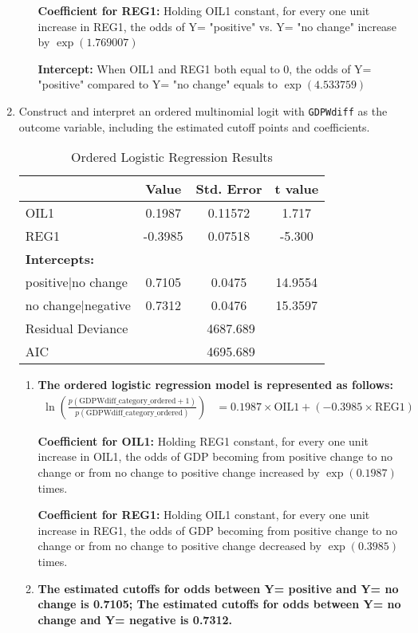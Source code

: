 \documentclass[12pt,letterpaper]{article}
\begin{document}
\begin{enumerate}
\begin{enumerate}
		\textbf{Coefficient for REG1:}
		Holding OIL1 constant, for every one unit increase in REG1, the odds of Y= "positive" vs. Y= "no change" increase by $\exp(1.769007)$
		
		\textbf{Intercept:}
		When OIL1 and REG1 both equal to 0, the odds of Y= "positive" compared to Y= "no change" equals to $\exp(4.533759)$
	\end{enumerate}
	\vspace{3 cm}
	\item Construct and interpret an ordered multinomial logit with \texttt{GDPWdiff} as the outcome variable, including the estimated cutoff points and coefficients.
	 
	\begin{table}[htbp]
		\centering
		\caption{Ordered Logistic Regression Results}
		\begin{tabular}{lccc}
			\toprule
			& \textbf{Value} & \textbf{Std. Error} & \textbf{t value} \\
			\midrule
			OIL1  & 0.1987 & 0.11572 & 1.717 \\
			REG1  & -0.3985 & 0.07518 & -5.300 \\
			\midrule
			\multicolumn{4}{l}{\textbf{Intercepts:}} \\
			\midrule
			positive|no change  & 0.7105 & 0.0475 & 14.9554 \\
			no change|negative  & 0.7312 & 0.0476 & 15.3597 \\
			\midrule
			Residual Deviance & \multicolumn{3}{c}{4687.689} \\
			AIC   & \multicolumn{3}{c}{4695.689} \\
			\bottomrule
		\end{tabular}
		\label{tab:ordered_logistic_results}
	\end{table}
	\vspace{2cm}
	\begin{enumerate}
		\item \textbf{The ordered logistic regression model is represented as follows:}
		\begin{align*}
			\ln\left(\frac{p(\text{GDPWdiff\_category\_ordered}+1)}{p(\text{GDPWdiff\_category\_ordered})}\right) &= 0.1987 \times \text{OIL1} + (-0.3985 \times \text{REG1})
		\end{align*}
		
		\textbf{Coefficient for OIL1:}
		Holding REG1 constant, for every one unit increase in OIL1, the odds of GDP becoming from positive change to no change or from no change to positive change increased by $\exp(0.1987)$ times.
		
		\textbf{Coefficient for REG1:}
		Holding OIL1 constant, for every one unit increase in REG1, the odds of GDP becoming from positive change to no change or from no change to positive change decreased by $\exp(0.3985)$ times.
		
		\item \textbf{The estimated cutoffs for odds between Y= positive and Y= no change is 0.7105; The estimated cutoffs for odds between Y= no change and Y= negative is 0.7312.}
	\end{enumerate}
\end{enumerate}
\end{document}
